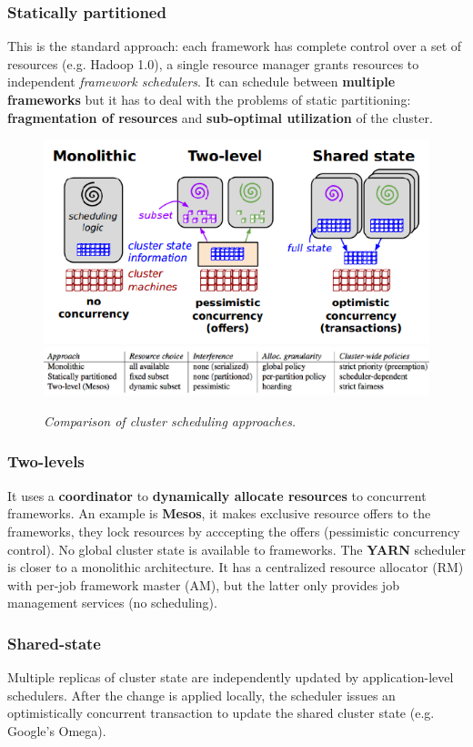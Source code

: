 	\subsubsection{Statically partitioned}
	This is the standard approach: each framework has complete control over a set of resources (e.g. Hadoop 1.0), a single resource manager grants resources to independent \textit{framework schedulers}.\newline
	It can schedule between \textbf{multiple frameworks} but it has to deal with the problems of static partitioning: \textbf{fragmentation of resources} and \textbf{sub-optimal utilization} of the cluster.
	\begin{figure}[H]
		\centering
		\includegraphics[width=0.5\linewidth]{images/clust_sched_arch.png}
		\includegraphics[width=\linewidth]{images/clust_sched_comparison.png}
		\caption{\textit{Comparison of cluster scheduling approaches.}}
	\end{figure}
	\subsubsection{Two-levels}
	It uses a \textbf{coordinator} to \textbf{dynamically allocate resources} to concurrent frameworks.\newline
	An example is \textbf{Mesos}, it makes exclusive resource offers to the frameworks, they lock resources by acccepting the offers (pessimistic concurrency control). No global cluster state is available to frameworks.\newline
	The \textbf{YARN} scheduler is closer to a monolithic architecture. It has a centralized resource allocator (RM) with per-job framework master (AM), but the latter only provides job management services (no scheduling).
	\subsubsection{Shared-state}
	Multiple replicas of cluster state are independently updated by application-level schedulers. After the change is applied locally, the scheduler issues an optimistically concurrent transaction to update the shared cluster state (e.g. Google's Omega).

